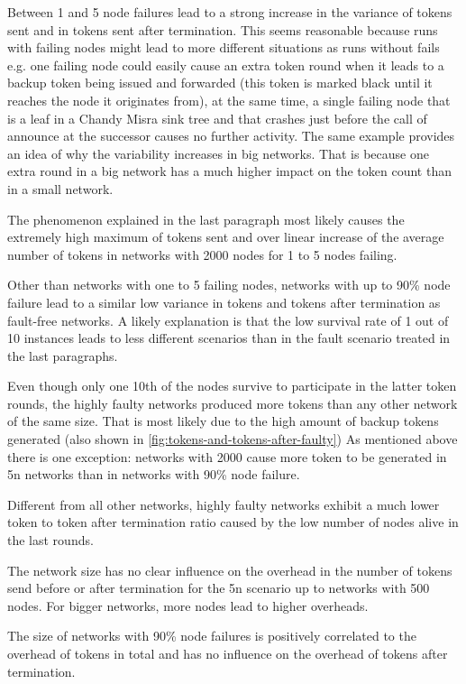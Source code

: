 Between 1 and 5 node failures lead to a strong increase in the variance of tokens sent and in tokens sent after termination.
This seems reasonable because runs with failing nodes might lead to more different situations as runs without fails e.g. one failing node could easily cause an extra token round when it leads to a backup token being issued and forwarded (this token is marked black until it reaches the node it originates from), at the same time, a single failing node that is a leaf in a Chandy Misra sink tree and that crashes just before the call of announce at the successor  causes no further activity.
The same example provides an idea of why the variability increases in big networks. 
That is because one extra round in a big network has a much higher impact on the token count than in a small network.

The phenomenon explained in the last paragraph most likely causes the extremely high maximum of tokens sent and over linear increase of the average number of tokens in networks with 2000 nodes for 1 to 5 nodes failing.

Other than networks with one to 5 failing nodes, networks with up to 90\% node failure lead to a similar low variance in tokens and tokens after termination as fault-free networks.
A likely explanation is that the low survival rate of 1 out of 10 instances leads to less different scenarios than in the fault scenario treated in the last paragraphs.

Even though only one 10th of the nodes survive to participate in the latter token rounds, the highly faulty networks produced more tokens than any other network of the same size.
That is most likely due to the high amount of backup tokens generated (also shown in \cref{fig:tokens-and-tokens-after-faulty})
As mentioned above there is one exception: networks with 2000 cause more token to be generated in 5n networks than in networks with 90\% node failure.

Different from all other networks, highly faulty networks exhibit a much lower token to token after termination ratio caused by the low number of nodes alive in the last rounds.

The network size has no clear influence on the overhead in the number of tokens send before or after termination for the 5n scenario up to networks with 500 nodes. 
For bigger networks, more nodes lead to higher overheads.

The size of networks with 90\% node failures is positively correlated to the overhead of tokens in total and has no influence on the overhead of tokens after termination.

